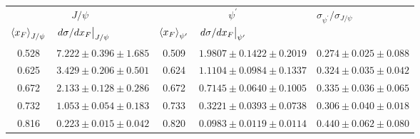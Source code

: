 \begin{tabular}{cc|cc|c}
\hline
\multicolumn{2}{c|}{$J/\psi$} &
  \multicolumn{2}{c|}{$\psi^{\prime}$} &
  \multicolumn{1}{l}{\multirow{2}{*}{$\sigma_{\psi^\prime}/\sigma_{J/\psi}$}} \\ \cline{1-4}
\multicolumn{1}{l}{$\expval{x_F}_{J/\psi}$} &
  \multicolumn{1}{l|}{$\eval{d\sigma/dx_F}_{J/\psi}$} &
  \multicolumn{1}{l}{$\expval{x_F}_{\psi^\prime}$} &
  \multicolumn{1}{l|}{$\eval{d\sigma/dx_F}_{\psi^\prime}$} &
  \multicolumn{1}{l}{} \\ \hline
\multicolumn{1}{c|}{0.528} &
  $7.222\pm0.396\pm1.685$ &
  \multicolumn{1}{c|}{0.509} &
  $1.9807\pm0.1422\pm0.2019$ &
  $0.274\pm0.025\pm0.088$ \\
\multicolumn{1}{c|}{0.625} &
  $3.429\pm0.206\pm0.501$ &
  \multicolumn{1}{c|}{0.624} &
  $1.1104\pm0.0984\pm0.1337$ &
  $0.324\pm0.035\pm0.042$ \\
\multicolumn{1}{c|}{0.672} &
  $2.133\pm0.128\pm0.286$ &
  \multicolumn{1}{c|}{0.672} &
  $0.7145\pm0.0640\pm0.1005$ &
  $0.335\pm0.036\pm0.065$ \\
\multicolumn{1}{c|}{0.732} &
  $1.053\pm0.054\pm0.183$ &
  \multicolumn{1}{c|}{0.733} &
  $0.3221\pm0.0393\pm0.0738$ &
  $0.306\pm0.040\pm0.018$ \\
\multicolumn{1}{c|}{0.816} &
  $0.223\pm0.015\pm0.042$ &
  \multicolumn{1}{c|}{0.820} &
  $0.0983\pm0.0119\pm0.0114$ &
  $0.440\pm0.062\pm0.080$ \\ \hline
\end{tabular}

